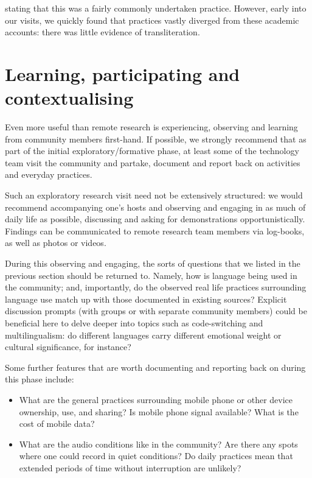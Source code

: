\documentclass[10pt,twoside,openright]{report}
\begin{document}
\vspace{-3.5em}
\begin{unmutehighlight}
stating that this was a fairly commonly undertaken practice.
However, early into our visits, we quickly found that practices vastly diverged from these academic accounts: there was little evidence of transliteration.
\vspace{0.1em}
\end{unmutehighlight}
\vspace{-0.1em}


\section{Learning, participating and contextualising}
Even more useful than remote research is experiencing, observing and learning from community members first-hand.
If possible, we strongly recommend that as part of the initial exploratory/formative phase, at least some of the technology team visit the community and partake, document and report back on activities and everyday practices.

Such an exploratory research visit need not be extensively structured: we would recommend accompanying one's hosts and observing and engaging in as much of daily life as possible, discussing and asking for demonstrations opportunistically.
Findings can be communicated to remote research team members via log-books, as well as photos or videos.

During this observing and engaging, the sorts of questions that we listed in the previous section should be returned to.
Namely, how is language being used in the community; and, importantly, do the observed real life practices surrounding language use match up with those documented in existing sources?
Explicit discussion prompts (with groups or with separate community members) could be beneficial here to delve deeper into topics such as code-switching and multilingualism: do different languages carry different emotional weight or cultural significance, for instance? 

Some further features that are worth documenting and reporting back on during this phase include: 
\begin{itemize}
    \item What are the general practices surrounding mobile phone or other device ownership, use, and sharing? Is mobile phone signal available? What is the cost of mobile data? 
    \item What are the audio conditions like in the community?
    Are there any spots where one could record in quiet conditions?
    Do daily practices mean that extended periods of time without interruption are unlikely?
\end{itemize}
\end{document}
